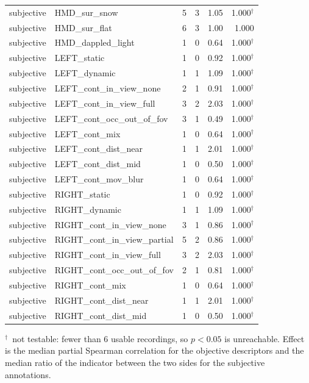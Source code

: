\documentclass[11pt,a4paper]{article}
\begin{document}
\begin{longtable}{llrrrr}
subjective & HMD\_sur\_snow & 5 & 3 & 1.05 & 1.000$^{\dagger}$ \\
subjective & HMD\_sur\_flat & 6 & 3 & 1.00 & 1.000 \\
subjective & HMD\_dappled\_light & 1 & 0 & 0.64 & 1.000$^{\dagger}$ \\
subjective & LEFT\_static & 1 & 0 & 0.92 & 1.000$^{\dagger}$ \\
subjective & LEFT\_dynamic & 1 & 1 & 1.09 & 1.000$^{\dagger}$ \\
subjective & LEFT\_cont\_in\_view\_none & 2 & 1 & 0.91 & 1.000$^{\dagger}$ \\
subjective & LEFT\_cont\_in\_view\_full & 3 & 2 & 2.03 & 1.000$^{\dagger}$ \\
subjective & LEFT\_cont\_occ\_out\_of\_fov & 3 & 1 & 0.49 & 1.000$^{\dagger}$ \\
subjective & LEFT\_cont\_mix & 1 & 0 & 0.64 & 1.000$^{\dagger}$ \\
subjective & LEFT\_cont\_dist\_near & 1 & 1 & 2.01 & 1.000$^{\dagger}$ \\
subjective & LEFT\_cont\_dist\_mid & 1 & 0 & 0.50 & 1.000$^{\dagger}$ \\
subjective & LEFT\_cont\_mov\_blur & 1 & 0 & 0.64 & 1.000$^{\dagger}$ \\
subjective & RIGHT\_static & 1 & 0 & 0.92 & 1.000$^{\dagger}$ \\
subjective & RIGHT\_dynamic & 1 & 1 & 1.09 & 1.000$^{\dagger}$ \\
subjective & RIGHT\_cont\_in\_view\_none & 3 & 1 & 0.86 & 1.000$^{\dagger}$ \\
subjective & RIGHT\_cont\_in\_view\_partial & 5 & 2 & 0.86 & 1.000$^{\dagger}$ \\
subjective & RIGHT\_cont\_in\_view\_full & 3 & 2 & 2.03 & 1.000$^{\dagger}$ \\
subjective & RIGHT\_cont\_occ\_out\_of\_fov & 2 & 1 & 0.81 & 1.000$^{\dagger}$ \\
subjective & RIGHT\_cont\_mix & 1 & 0 & 0.64 & 1.000$^{\dagger}$ \\
subjective & RIGHT\_cont\_dist\_near & 1 & 1 & 2.01 & 1.000$^{\dagger}$ \\
subjective & RIGHT\_cont\_dist\_mid & 1 & 0 & 0.50 & 1.000$^{\dagger}$ \\
\end{longtable}
\noindent\footnotesize $^{\dagger}$~not testable: fewer than 6 usable recordings, so $p<0.05$ is unreachable. Effect is the median partial Spearman correlation for the objective descriptors and the median ratio of the indicator between the two sides for the subjective annotations.\normalsize
\end{document}
